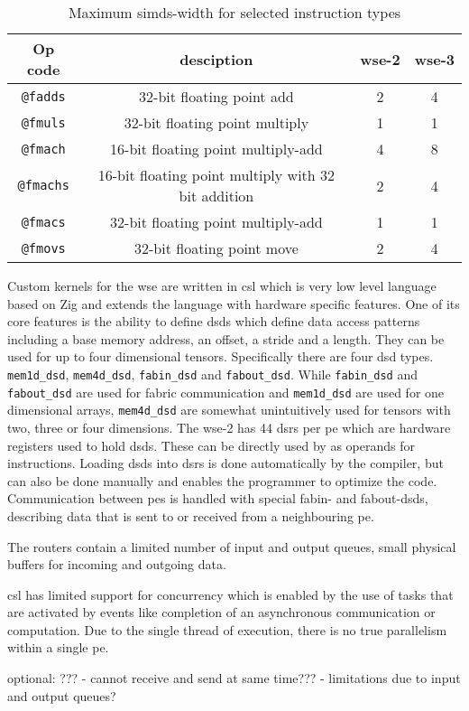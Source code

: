 \begin{table}[h]
    \centering
    \caption{Maximum \acp{simd}-width for selected instruction types}
    \label{tab:simd_operations}
    \begin{tabular}{@{}cccc@{}}
        \toprule
        Op code & desciption & \ac{wse}-2 & \ac{wse}-3 \\
        \midrule
        \texttt{@fadds} & 32-bit floating point add & 2 & 4 \\
        \texttt{@fmuls} & 32-bit floating point multiply & 1 & 1 \\
        \texttt{@fmach} & 16-bit floating point multiply-add & 4 & 8 \\
        \texttt{@fmachs} & 16-bit floating point multiply with 32 bit addition & 2 & 4 \\
        \texttt{@fmacs} & 32-bit floating point multiply-add & 1 & 1 \\
        \texttt{@fmovs} & 32-bit floating point move & 2 & 4 \\
        \bottomrule
    \end{tabular}
\end{table}

Custom kernels for the \ac{wse} are written in \ac{csl} which is very low level language based on Zig and extends the language with hardware specific features.
One of its core features is the ability to define \acp{dsd} which define data access patterns including a base memory address, an offset, a stride and a length. They can be used for up to four dimensional tensors. Specifically there are four \ac{dsd} types. \texttt{mem1d\_dsd}, \texttt{mem4d\_dsd}, \texttt{fabin\_dsd} and \texttt{fabout\_dsd}. While \texttt{fabin\_dsd} and \texttt{fabout\_dsd} are used for fabric communication and \texttt{mem1d\_dsd} are used for one dimensional arrays, \texttt{mem4d\_dsd} are somewhat unintuitively used for tensors with two, three or four dimensions. The \ac{wse}-2 has 44 \acp{dsr} per \ac{pe} which are hardware registers used to hold \acp{dsd}. These can be directly used by as operands for instructions. Loading \acp{dsd} into \acp{dsr} is done automatically by the compiler, but can also be done manually and enables the programmer to optimize the code. Communication between \acp{pe} is handled with special fabin- and fabout-\acp{dsd}, describing data that is sent to or received from a neighbouring \ac{pe}.

The routers contain a limited number of input and output queues, small physical buffers for incoming and outgoing data.

\ac{csl} has limited support for concurrency which is enabled by the use of tasks that are activated by events like completion of an asynchronous communication or computation. Due to the single thread of execution, there is no true parallelism within a single \ac{pe}.

optional: ???
- cannot receive and send at same time???
- limitations due to input and output queues? 
